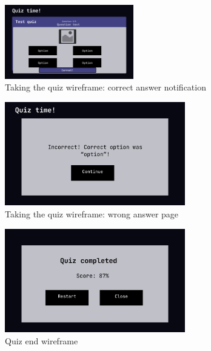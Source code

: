 \documentclass[
    english, %
]{VUMIFPSkursinis}
\begin{document}
\begin{figure}[ht]
    \centering
    \includegraphics[width=0.5\textwidth]{../lab3diags/taking-quiz-wireframes/Correct answer feedback.png}
    \caption{Taking the quiz wireframe: correct answer notification}
    \label{correct-wireframe-quiz-play}
\end{figure}

\pagebreak

\begin{figure}[ht]
    \centering
    \includegraphics[width=0.7\textwidth]{../lab3diags/taking-quiz-wireframes/Incorrect answer feedback.png}
    \caption{Taking the quiz wireframe: wrong answer page}
    \label{wrong-wireframe-quiz-play}
\end{figure}

\begin{figure}[ht]
    \centering
    \includegraphics[width=0.7\textwidth]{../lab3diags/taking-quiz-wireframes/Quiz completed.png}
    \caption{Quiz end wireframe}
    \label{wireframe-quiz-completed}
\end{figure}
\end{document}

